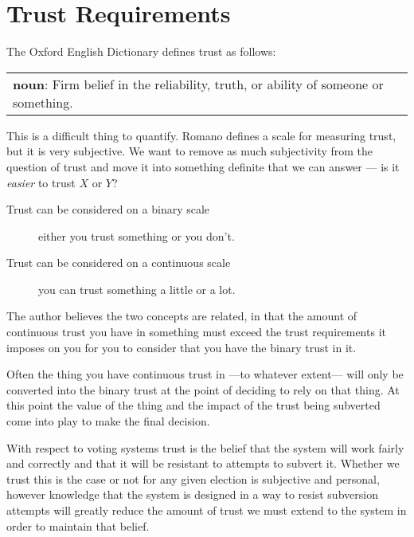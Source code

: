 \section{Trust Requirements}
\label{ch:req:trust}

The Oxford English Dictionary defines trust as follows:

\vspace{1em}
\noindent \begin{tabular}{|p{}}
    \noindent \textbf{noun}: Firm belief in the reliability, truth, or ability of someone or something.
\end{tabular}
\vspace{1em}

This is a difficult thing to quantify. Romano \cite{romanoNatureTrustConceptual2003} defines a scale for measuring trust, but it is very subjective. We want to remove as much subjectivity from the question of trust and move it into something definite that we can answer --- is it \emph{easier} to trust $X$ or $Y$?

\begin{description}
    \item[Trust can be considered on a binary scale] either you trust something or you don't.
    \item[Trust can be considered on a continuous scale] you can trust something a little or a lot.
\end{description}

The author believes the two concepts are related, in that the amount of continuous trust you have in something must exceed the trust requirements it imposes on you for you to consider that you have the binary trust in it.

Often the thing you have continuous trust in ---to whatever extent--- will only be converted into the binary trust at the point of deciding to rely on that thing. At this point the value of the thing and the impact of the trust being subverted come into play to make the final decision.

With respect to voting systems trust is the belief that the system will work fairly and correctly and that it will be resistant to attempts to subvert it. Whether we trust this is the case or not for any given election is subjective and personal, however knowledge that the system is designed in a way to resist subversion attempts will greatly reduce the amount of trust we must extend to the system in order to maintain that belief.


